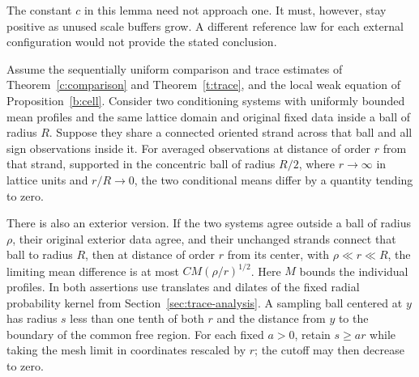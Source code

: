 The constant $c$ in this lemma need not approach one. It must, however,
stay positive as unused scale buffers grow. A different reference law for
each external configuration would not provide the stated conclusion.

\begin{lemma}\label{h:locality}
Assume the sequentially uniform comparison and trace estimates of
Theorem~\ref{c:comparison} and Theorem~\ref{t:trace}, and the local
weak equation of Proposition~\ref{b:cell}. Consider two conditioning
systems with uniformly bounded mean profiles and the same lattice
domain and original fixed data inside a ball of radius $R$. Suppose
they share a connected oriented strand across that ball and all sign
observations inside it. For averaged observations at distance of order $r$
from that strand, supported in the concentric ball of radius $R/2$,
where $r\to\infty$ in lattice units and $r/R\to0$,
the two conditional means differ by a quantity tending to zero.

There is also an exterior version. If the two systems agree outside
a ball of radius $\rho$, their original exterior data agree, and their
unchanged strands connect that ball to radius $R$, then at distance
of order $r$ from its center, with $\rho\ll r\ll R$, the limiting
mean difference is at most $CM(\rho/r)^{1/2}$. Here $M$ bounds the
individual profiles. In both assertions use translates and dilates
of the fixed radial probability kernel from
Section~\ref{sec:trace-analysis}. A sampling ball centered at $y$
has radius $s$ less than one tenth of both $r$ and the distance from
$y$ to the boundary of the common free region. For each fixed $a>0$,
retain $s\ge ar$ while taking the mesh limit in coordinates rescaled
by $r$; the cutoff may then decrease to zero.
\end{lemma}
